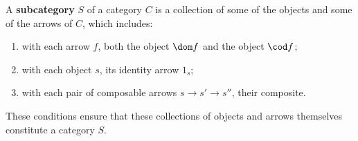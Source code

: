 A \textbf{subcategory} $S$ of a category $C$ is a collection of some of the objects and some of the arrows of $C$, which includes:
\begin{enumerate}
  \item with each arrow $f$, both the object $\dom f$ and the object $\cod f$;
  \item with each object $s$, its identity arrow $1_s$;
  \item with each pair of composable arrows $s \rightarrow s' \rightarrow s''$, their composite.
\end{enumerate}
These conditions ensure that these collections of objects and arrows themselves constitute a category $S$.
